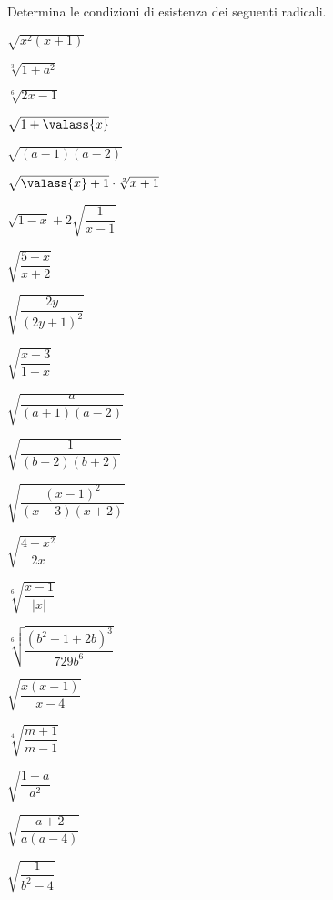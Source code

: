\begin{esercizio}[\Ast]
 \label{ese:2.12}
Determina le condizioni di esistenza dei seguenti radicali.
 \begin{multicols}{3}
 \begin{enumeratea}
 \item $\sqrt{x^2(x+1)}$
 \item $\sqrt[3]{1+a^2}$
 \item $\sqrt[6]{2x-1}$
 \item $\sqrt{1+\valass{x}}$
 \item $\sqrt{(a-1)(a-2)}$
 \item $\sqrt{\valass{x}+1}\cdot \sqrt[3]{x+1}$
 \item $\sqrt{1-x}+2\sqrt{\dfrac 1{x-1}}$
 \item $\sqrt{\dfrac{5-x}{x+2}}$
 \item $\sqrt{\dfrac{2y}{(2y+1)^2}}$
 \item $\sqrt{\dfrac{x-3}{1-x}}$
 \item $\sqrt{\dfrac{a}{(a+1)(a-2)}}$
 \item $\sqrt{\dfrac{1}{(b-2)(b+2)}}$
 \item $\sqrt{\dfrac{(x-1)^2}{(x-3)(x+2)}}$
 \item $\sqrt{\dfrac{4+x^2}{2x}}$
 \item $\sqrt[6]{\dfrac{x-1}{\left|x\right|}}$
 \item $\sqrt[6]{\dfrac{\left(b^2+1+2b\right)^3}{729b^6}}$
 \item $\sqrt{\dfrac{x(x-1)}{x-4}}$
 \item $\sqrt[4]{\dfrac{m+1}{m-1}}$
 \item $\sqrt{\dfrac{1+a}{a^2}}$
 \item $\sqrt{\dfrac{a+2}{a(a-4)}}$
 \item $\sqrt{\dfrac 1{b^2-4}}$
 \end{enumeratea}
 \end{multicols}
\end{esercizio}

